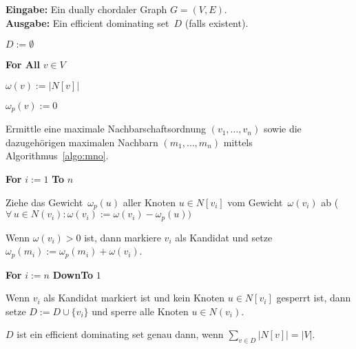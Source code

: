 \begin{Algorithm}[dcED]\label{algo:dcED}
    \textbf{Eingabe:} Ein dually chordaler Graph $G=(V,E)$.\\
    \textbf{Ausgabe:} Ein efficient dominating set~$D$ (falls existent).\\

    \begin{codeLine}
        \item $D := \emptyset$
        
        \item \textbf{For All} $v \in V$
              \begin{innerCodeLine}
                  \item[] $\omega(v) := |N[v]|$
                  \item[] $\omega_p(v) := 0$
              \end{innerCodeLine}
        
        \item Ermittle eine maximale Nachbarschaftsordnung $(v_1,\ldots,v_n)$ sowie die dazugehörigen maximalen Nachbarn $(m_1,\ldots,m_n)$ mittels Algorithmus~\ref{algo:mno}.
        
        \item \textbf{For} $i:= 1$ \textbf{To} $n$
              \begin{innerCodeLine}
                  \item Ziehe das Gewicht~$\omega_p(u)$ aller Knoten $u \in N[v_i]$ vom Gewicht~$\omega(v_i)$ ab ($\forall\,u \in N(v_i): \omega(v_i):=\omega(v_i)-\omega_p(u))$
                  
                  \item Wenn $\omega(v_i)>0$ ist, dann markiere $v_i$ als Kandidat und setze $\omega_p(m_i) := \omega_p(m_i) + \omega(v_i)$.
              \end{innerCodeLine}
              
        \item \textbf{For} $i:= n$ \textbf{DownTo} $1$\nopagebreak
              \begin{innerCodeLine}
                  \item[] Wenn $v_i$ als Kandidat markiert ist und kein Knoten $u \in N[v_i]$ gesperrt ist, dann setze $D := D \cup \{v_i\}$ und sperre alle Knoten $u \in N(v_i)$.
              \end{innerCodeLine}
              
        \item  $D$ ist ein efficient dominating set genau dann, wenn $\sum_{v \in D}|N[v]|=|V|$.
    \end{codeLine}
\end{Algorithm}

